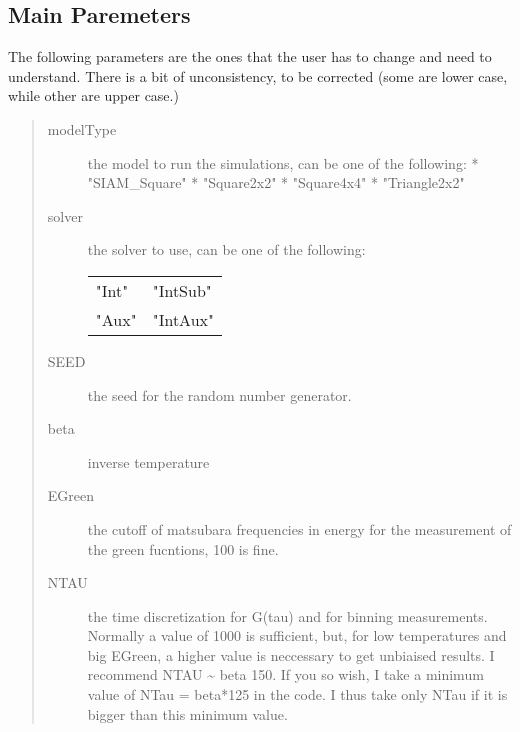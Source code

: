 \documentclass[letterpaper,10pt,english]{sphinxmanual}
\begin{document}
\subsection{Main Paremeters}
\label{\detokenize{params:main-paremeters}}
The following parameters are the ones that the user has to change and need to understand. There is a bit of unconsistency, to be corrected
(some are lower case, while other are upper case.)
\begin{quote}
\begin{description}
\item[{modelType}] \leavevmode
the model to run the simulations, can be one of the following:
* "SIAM\_Square"
* "Square2x2"
* "Square4x4"
* "Triangle2x2"

\item[{solver}] \leavevmode
the solver to use, can be one of the following:


\begin{savenotes}\sphinxattablestart
\centering
\begin{tabulary}{\linewidth}[t]{|T|T|}
\hline
{}\relax &\relax \\
\hline
"Int"
&
"IntSub"
\\
\hline
"Aux"
&
"IntAux"
\\
\hline
\end{tabulary}
\par
\sphinxattableend\end{savenotes}

\item[{SEED}] \leavevmode
the seed for the random number generator.

\item[{beta}] \leavevmode
inverse temperature

\item[{EGreen}] \leavevmode
the cutoff of matsubara frequencies in energy for the measurement of the green fucntions, 100 is fine.

\item[{NTAU}] \leavevmode
the time discretization for G(tau) and for binning measurements. Normally
a value of 1000 is sufficient, but, for low temperatures and big EGreen,
a higher value is neccessary to get unbiaised results. I recommend NTAU \textasciitilde{} beta 150.
If you so wish, I take a minimum value of NTau = beta*125 in the code. I thus take
only NTau if it is bigger than this minimum value.



\end{description}
\end{quote}
\end{document}
